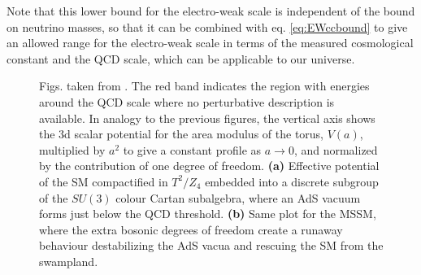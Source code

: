 \documentclass[11pt,a4paper]{article}
\begin{document}
Note that this lower bound for the electro-weak scale is independent of the bound on neutrino masses, so that it can be  combined with eq. \eqref{eq:EWccbound} to give an allowed range for the electro-weak scale in terms of the measured cosmological constant and the QCD scale, which can be applicable to our universe.


\begin{figure}[t]
	\begin{center}
		\caption{\protect \footnotesize Figs. taken from \cite{Gonzalo:2018tpb}. The red band indicates the region with energies around the QCD scale where no perturbative description is available. In analogy to the previous figures, the vertical axis shows the 3d scalar potential for the area modulus of the torus, $V(a)$, multiplied by $a^2$ to give a constant profile as $a\rightarrow 0$, and normalized by the contribution of one degree of freedom.
			\textbf{(a)}	Effective potential of the SM compactified in $T^{2}/Z_{4}$ embedded into a discrete  subgroup of the $SU(3)$ colour Cartan subalgebra, where an AdS vacuum forms just below the QCD threshold. \textbf{(b)} Same plot for the MSSM, where the extra bosonic degrees of freedom create a runaway behaviour destabilizing the AdS vacua and rescuing the SM from the swampland. }
		\label{segment_periodic_SM}
	\end{center}
\end{figure}  
\end{document}
